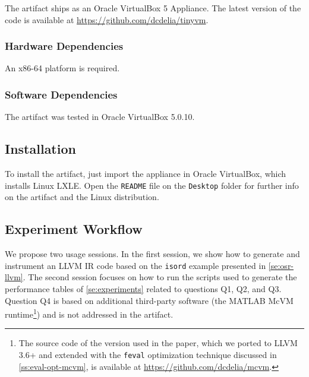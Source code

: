 The artifact ships as an Oracle VirtualBox 5 Appliance.
The latest version of the code is available at \url{https://github.com/dcdelia/tinyvm}.

\subsubsection{Hardware Dependencies}

An x86-64 platform is required.

\subsubsection{Software Dependencies}

The artifact was tested in Oracle VirtualBox 5.0.10. 


\subsection{Installation}

To install the artifact, just import the appliance in Oracle VirtualBox, which installs Linux LXLE. Open the {\tt README} file on the {\tt Desktop} folder for further info on the artifact and the Linux distribution.

\subsection{Experiment Workflow}

We propose two usage sessions. In the first session, we show how to generate and instrument an LLVM IR code based on the \texttt{isord} example presented in \mysection\ref{se:osr-llvm}. The second session focuses on how to run the scripts used to generate the performance tables of \mysection\ref{se:experiments} related to questions Q1, Q2, and Q3. Question Q4 is based on additional third-party software (the MATLAB McVM runtime\footnote{The source code of the version used in the paper, which we ported to LLVM 3.6+ and extended with the {\tt feval} optimization technique discussed in \ref{ss:eval-opt-mcvm}, is available at \url{https://github.com/dcdelia/mcvm}.}) and is not addressed in the artifact.

